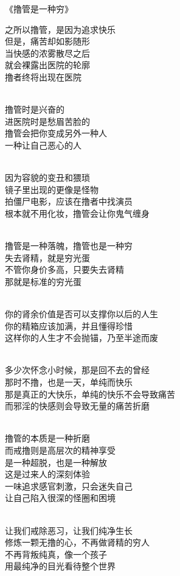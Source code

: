 \documentclass{ctexart}
\begin{document}
\begin{center}
    《撸管是一种穷》\it
    \begin{multicols}{2}
        之所以撸管，是因为追求快乐 \\ 但是，痛苦却如影随形 \\ 当快感的浓雾散尽之后 \\ 就会裸露出医院的轮廓 \\ 撸者终将出现在医院

        ~\\

        撸管时是兴奋的 \\ 进医院时是愁眉苦脸的 \\ 撸管会把你变成另外一种人 \\ 一种让自己恶心的人

        ~\\

        因为容貌的变丑和猥琐 \\ 镜子里出现的更像是怪物 \\ 拍僵尸电影，应该在撸者中找演员 \\ 根本就不用化妆，撸管会让你鬼气缠身

        ~\\

        撸管是一种落魄，撸管也是一种穷 \\ 失去肾精，就是穷光蛋 \\ 不管你身价多高，只要失去肾精 \\ 那就是标准的穷光蛋

        ~\\

        你的肾余价值是否可以支撑你以后的人生 \\ 你的精箱应该加满，并且懂得珍惜 \\ 这样你的人生才不会抛锚，乃至半途而废

        ~\\

        多少次怀念小时候，那是回不去的曾经 \\ 那时不撸，也是一天，单纯而快乐 \\ 那是真正的大快乐，单纯的快乐不会导致痛苦 \\ 而邪淫的快感则会导致无量的痛苦折磨

        ~\\

        撸管的本质是一种折磨 \\ 而戒撸则是高层次的精神享受 \\ 是一种超脱，也是一种解放 \\ 这是过来人的深刻体验 \\ 一味追求感官刺激，只会迷失自己 \\ 让自己陷入很深的怪圈和困境

        ~\\

        让我们戒除恶习，让我们纯净生长 \\ 修炼一颗无撸的心，不再做肾精的穷人 \\ 不再背叛纯真，像一个孩子 \\ 用最纯净的目光看待整个世界
    \end{multicols}
\end{center}
\end{document}
